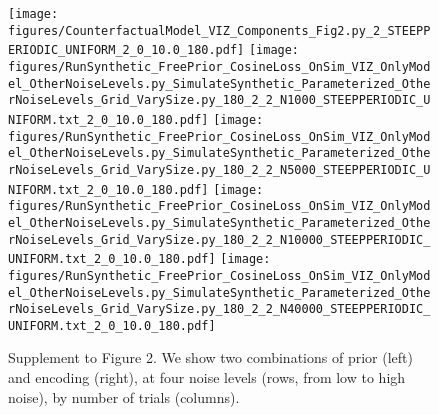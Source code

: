 \documentclass{article}
\begin{document}
\begin{figure}
\texttt{[image: figures/CounterfactualModel\_VIZ\_Components\_Fig2.py\_2\_STEEPPERIODIC\_UNIFORM\_2\_0\_10.0\_180.pdf]}
\texttt{[image: figures/RunSynthetic\_FreePrior\_CosineLoss\_OnSim\_VIZ\_OnlyModel\_OtherNoiseLevels.py\_SimulateSynthetic\_Parameterized\_OtherNoiseLevels\_Grid\_VarySize.py\_180\_2\_2\_N1000\_STEEPPERIODIC\_UNIFORM.txt\_2\_0\_10.0\_180.pdf]}
\texttt{[image: figures/RunSynthetic\_FreePrior\_CosineLoss\_OnSim\_VIZ\_OnlyModel\_OtherNoiseLevels.py\_SimulateSynthetic\_Parameterized\_OtherNoiseLevels\_Grid\_VarySize.py\_180\_2\_2\_N5000\_STEEPPERIODIC\_UNIFORM.txt\_2\_0\_10.0\_180.pdf]}
\texttt{[image: figures/RunSynthetic\_FreePrior\_CosineLoss\_OnSim\_VIZ\_OnlyModel\_OtherNoiseLevels.py\_SimulateSynthetic\_Parameterized\_OtherNoiseLevels\_Grid\_VarySize.py\_180\_2\_2\_N10000\_STEEPPERIODIC\_UNIFORM.txt\_2\_0\_10.0\_180.pdf]}
\texttt{[image: figures/RunSynthetic\_FreePrior\_CosineLoss\_OnSim\_VIZ\_OnlyModel\_OtherNoiseLevels.py\_SimulateSynthetic\_Parameterized\_OtherNoiseLevels\_Grid\_VarySize.py\_180\_2\_2\_N40000\_STEEPPERIODIC\_UNIFORM.txt\_2\_0\_10.0\_180.pdf]}



\caption{Supplement to Figure 2. We show two combinations of prior (left) and encoding (right), at four noise levels (rows, from low to high noise), by number of trials (columns).}\label{fig:supp-to-fig2}
\end{figure}






\end{document}

